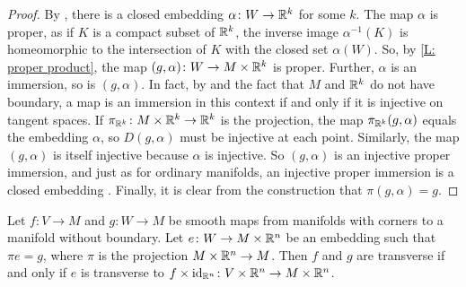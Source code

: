 \begin{proof}
	By \cite[Corollary 11.3.10]{MaDo92}, there is a closed embedding $\alpha \colon W \to \mathbb{R}^k$ for some $k$.
	The map $\alpha$ is proper, as if $K$ is a compact subset of $\mathbb{R}^k$, the inverse image $\alpha^{-1}(K)$ is homeomorphic to the intersection of $K$ with the closed set $\alpha(W)$.
	So, by \cref{L: proper product}, the map $(g,\alpha) \colon W \to M \times \mathbb{R}^k$ is proper.
	Further, $\alpha$ is an immersion, so is $(g,\alpha)$.
	In fact, by \cite[Theorem 3.2.6]{MaDo92} and the fact that $M$ and $\mathbb{R}^k$ do not have boundary, a map is an immersion in this context if and only if it is injective on tangent spaces.
	If $\pi_{\mathbb{R}^k} \colon M \times \mathbb{R}^k \to \mathbb{R}^k$ is the projection, the map $\pi_{\mathbb{R}^k}(g,\alpha)$ equals the embedding $\alpha$, so $D(g,\alpha)$ must be injective at each point.
	Similarly, the map $(g,\alpha)$ is itself injective because $\alpha$ is injective.
	So $(g,\alpha)$ is an injective proper immersion, and just as for ordinary manifolds, an injective proper immersion is a closed embedding \cite[Proposition 3.3.4]{MaDo92}.
	Finally, it is clear from the construction that $\pi (g,\alpha) = g$.
\end{proof}

\begin{lemma}\label{L: all transversality is wrt embeddings}
	Let $f \colon V \to M$ and $g \colon W \to M$ be smooth maps from manifolds with corners to a manifold without boundary.
	Let $e \colon W \to M \times \mathbb{R}^n$ be an embedding such that $\pi e = g$, where $\pi$ is the projection $M \times \mathbb{R}^n \to M$.
	Then $f$ and $g$ are transverse if and only if $e$ is transverse to $f \times \mathrm{id}_{\mathbb{R}^n} \colon V \times \mathbb{R}^n \to M \times \mathbb{R}^n$.
\end{lemma}

